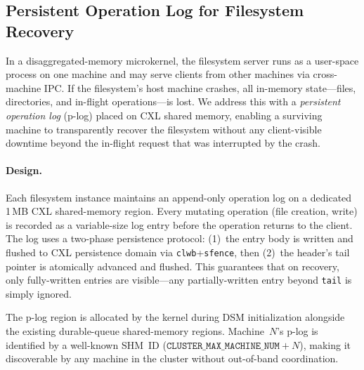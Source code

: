 
\subsection{Persistent Operation Log for Filesystem Recovery}
\label{sec:plog-recovery}

In a disaggregated-memory microkernel, the filesystem server runs as a
user-space process on one machine and may serve clients from other machines via
cross-machine IPC.  If the filesystem's host machine crashes, all in-memory
state---files, directories, and in-flight operations---is lost.  We address
this with a \emph{persistent operation log} (p-log) placed on CXL shared
memory, enabling a surviving machine to transparently recover the filesystem
without any client-visible downtime beyond the in-flight request that was
interrupted by the crash.

\paragraph{Design.}
Each filesystem instance maintains an append-only operation log on a dedicated
1\,MB CXL shared-memory region.  Every mutating operation (file creation,
write) is recorded as a variable-size log entry before the operation returns to
the client.  The log uses a two-phase persistence protocol: (1)~the entry body
is written and flushed to CXL persistence domain via \texttt{clwb}+\texttt{sfence},
then (2)~the header's tail pointer is atomically advanced and flushed.  This
guarantees that on recovery, only fully-written entries are visible---any
partially-written entry beyond \texttt{tail} is simply ignored.

The p-log region is allocated by the kernel during DSM initialization alongside
the existing durable-queue shared-memory regions.  Machine~$N$'s p-log is
identified by a well-known SHM~ID
($\texttt{CLUSTER\_MAX\_MACHINE\_NUM} + N$),
making it discoverable by any machine in the cluster without out-of-band
coordination.

